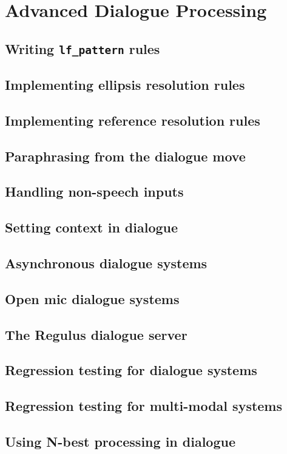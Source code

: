 \chapter{Advanced Dialogue Processing}
\label{Chapter:AdvancedDialogue}

\author{Manny Rayner}

\section{Writing {\tt lf\_pattern} rules}
\label{Section:LFPatterns}

\section{Implementing ellipsis resolution rules}
\label{Section:EllipsisResolution}

\section{Implementing reference resolution rules}
\label{Section:ReferenceResolution}

\section{Paraphrasing from the dialogue move}
\label{Section:DialogueParaphrasing}

\section{Handling non-speech inputs}
\label{Section:NonSpeechInputs}

\section{Setting context in dialogue}
\label{Section:SettingDialogueContext}

\section{Asynchronous dialogue systems}
\label{Section:Asynchronous}

\section{Open mic dialogue systems}
\label{Section:OpenMic}

\section{The Regulus dialogue server}
\label{Section:DialogueServer}

\section{Regression testing for dialogue systems}
\label{Section:RegressionTestingDialogue}

\section{Regression testing for multi-modal systems}
\label{Section:RegressionTestingMultiModal}

\section{Using N-best processing in dialogue}
\label{Section:DialogueNBest}

